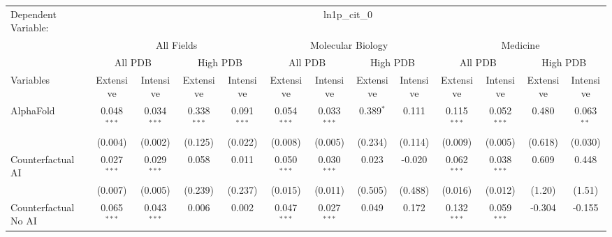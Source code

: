 \begingroup
\centering
\begin{tabular}{lcccccccccccc}
   \tabularnewline \midrule \midrule
   Dependent Variable: & \multicolumn{12}{c}{ln1p\_cit\_0}\\
 & \multicolumn{4}{c}{All Fields} & \multicolumn{4}{c}{Molecular Biology} & \multicolumn{4}{c}{Medicine} \\
\cmidrule(lr){2-5} \cmidrule(lr){6-9} \cmidrule(lr){10-13}
 & \multicolumn{2}{c}{All PDB} & \multicolumn{2}{c}{High PDB} & \multicolumn{2}{c}{All PDB} & \multicolumn{2}{c}{High PDB} & \multicolumn{2}{c}{All PDB} & \multicolumn{2}{c}{High PDB} \\
\cmidrule(lr){2-3} \cmidrule(lr){4-5} \cmidrule(lr){6-7} \cmidrule(lr){8-9} \cmidrule(lr){10-11} \cmidrule(lr){12-13}
Variables & \multicolumn{1}{c}{Extensive} & \multicolumn{1}{c}{Intensive} & \multicolumn{1}{c}{Extensive} & \multicolumn{1}{c}{Intensive} & \multicolumn{1}{c}{Extensive} & \multicolumn{1}{c}{Intensive} & \multicolumn{1}{c}{Extensive} & \multicolumn{1}{c}{Intensive} & \multicolumn{1}{c}{Extensive} & \multicolumn{1}{c}{Intensive} & \multicolumn{1}{c}{Extensive} & \multicolumn{1}{c}{Intensive} \\
\cmidrule(lr){1-1}\cmidrule(lr){2-2} \cmidrule(lr){3-3} \cmidrule(lr){4-4} \cmidrule(lr){5-5} \cmidrule(lr){6-6} \cmidrule(lr){7-7} \cmidrule(lr){8-8} \cmidrule(lr){9-9} \cmidrule(lr){10-10} \cmidrule(lr){11-11} \cmidrule(lr){12-12} \cmidrule(lr){13-13}
   AlphaFold                                & 0.048$^{***}$ & 0.034$^{***}$  & 0.338$^{***}$ & 0.091$^{***}$ & 0.054$^{***}$ & 0.033$^{***}$ & 0.389$^{*}$ & 0.111   & 0.115$^{***}$ & 0.052$^{***}$  & 0.480   & 0.063$^{**}$\\   
                                            & (0.004)       & (0.002)        & (0.125)       & (0.022)       & (0.008)       & (0.005)       & (0.234)     & (0.114) & (0.009)       & (0.005)        & (0.618) & (0.030)\\   
   Counterfactual AI                        & 0.027$^{***}$ & 0.029$^{***}$  & 0.058         & 0.011         & 0.050$^{***}$ & 0.030$^{***}$ & 0.023       & -0.020  & 0.062$^{***}$ & 0.038$^{***}$  & 0.609   & 0.448\\   
                                            & (0.007)       & (0.005)        & (0.239)       & (0.237)       & (0.015)       & (0.011)       & (0.505)     & (0.488) & (0.016)       & (0.012)        & (1.20)  & (1.51)\\   
   Counterfactual No AI                     & 0.065$^{***}$ & 0.043$^{***}$  & 0.006         & 0.002         & 0.047$^{***}$ & 0.027$^{***}$ & 0.049       & 0.172   & 0.132$^{***}$ & 0.059$^{***}$  & -0.304  & -0.155\\   

\end{tabular}
